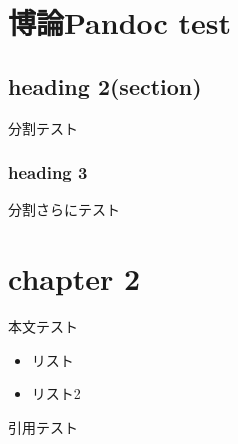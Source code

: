 \hypertarget{ux535aux8ad6pandoc-test}{%
\chapter{博論Pandoc test}\label{ux535aux8ad6pandoc-test}}

\hypertarget{heading-2section}{%
\section{heading 2(section)}\label{heading-2section}}

分割テスト

\hypertarget{heading-3}{%
\subsection{heading 3}\label{heading-3}}

分割さらにテスト

\hypertarget{chapter-2}{%
\chapter{chapter 2}\label{chapter-2}}

本文テスト

\begin{itemize}
\tightlist
\item
  リスト
\item
  リスト2
\end{itemize}

引用テスト\citep{Magnusson2009}
